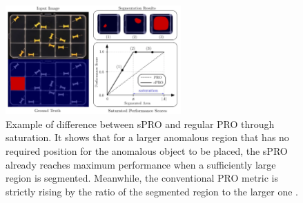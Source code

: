 \begin{figure}[H]
\centering
\includegraphics[width=0.6\textwidth]{figures/spro_vs_pro_bergmann.png}
 \caption{Example of difference between sPRO and regular PRO through saturation. It shows that for a larger anomalous region that has no required 
position for the anomalous object to be placed, the sPRO already reaches maximum performance when a sufficiently large 
region is segmented. Meanwhile, the conventional PRO metric is strictly rising by the ratio of the segmented region to the larger one \cite{LOCODentsAndScratchesBergmann2022}.}
 \label{fig:sprovspro}
\end{figure}



